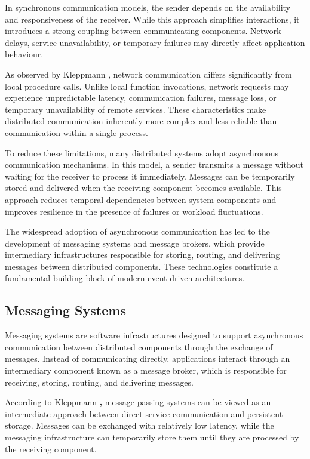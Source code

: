 \documentclass{scrartcl}
\begin{document}
In synchronous communication models, the sender depends on the availability and responsiveness of the receiver. While this approach simplifies interactions, it introduces a strong coupling between communicating components. Network delays, service unavailability, or temporary failures may directly affect application behaviour.

As observed by Kleppmann \cite{kleppmann2017}, network communication differs significantly from local procedure calls. Unlike local function invocations, network requests may experience unpredictable latency, communication failures, message loss, or temporary unavailability of remote services. These characteristics make distributed communication inherently more complex and less reliable than communication within a single process.

To reduce these limitations, many distributed systems adopt asynchronous communication mechanisms. In this model, a sender transmits a message without waiting for the receiver to process it immediately. Messages can be temporarily stored and delivered when the receiving component becomes available. This approach reduces temporal dependencies between system components and improves resilience in the presence of failures or workload fluctuations.

The widespread adoption of asynchronous communication has led to the development of messaging systems and message brokers, which provide intermediary infrastructures responsible for storing, routing, and delivering messages between distributed components. These technologies constitute a fundamental building block of modern event-driven architectures.

\subsection{Messaging Systems}

Messaging systems are software infrastructures designed to support asynchronous communication between distributed components through the exchange of messages. Instead of communicating directly, applications interact through an intermediary component known as a message broker, which is responsible for receiving, storing, routing, and delivering messages.

According to Kleppmann \textbf{\cite{kleppmann2017},} message-passing systems can be viewed as an intermediate approach between direct service communication and persistent storage. Messages can be exchanged with relatively low latency, while the messaging infrastructure can temporarily store them until they are processed by the receiving component.
\end{document}
